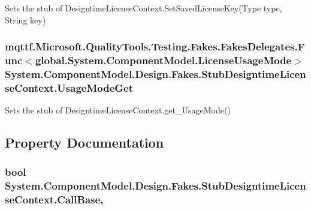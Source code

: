 Sets the stub of Designtime\-License\-Context.\-Set\-Saved\-License\-Key(\-Type type, String key)

\hypertarget{class_system_1_1_component_model_1_1_design_1_1_fakes_1_1_stub_designtime_license_context_a47bfbc122b13f313d9f43122c4f3a514}{
\subsubsection[{Usage\-Mode\-Get}]{\setlength{\rightskip}{0pt plus 5cm}mqttf.\-Microsoft.\-Quality\-Tools.\-Testing.\-Fakes.\-Fakes\-Delegates.\-Func$<$global.\-System.\-Component\-Model.\-License\-Usage\-Mode$>$ System.\-Component\-Model.\-Design.\-Fakes.\-Stub\-Designtime\-License\-Context.\-Usage\-Mode\-Get}}\label{class_system_1_1_component_model_1_1_design_1_1_fakes_1_1_stub_designtime_license_context_a47bfbc122b13f313d9f43122c4f3a514}


Sets the stub of Designtime\-License\-Context.\-get\-\_\-\-Usage\-Mode()



\subsection{Property Documentation}
\hypertarget{class_system_1_1_component_model_1_1_design_1_1_fakes_1_1_stub_designtime_license_context_ae4504dd9199411b13200f14d8644160c}{
\subsubsection[{Call\-Base}]{\setlength{\rightskip}{0pt plus 5cm}bool System.\-Component\-Model.\-Design.\-Fakes.\-Stub\-Designtime\-License\-Context.\-Call\-Base\hspace{0.3cm}{\ttfamily [get]}, {\ttfamily [set]}}}\label{class_system_1_1_component_model_1_1_design_1_1_fakes_1_1_stub_designtime_license_context_ae4504dd9199411b13200f14d8644160c}


